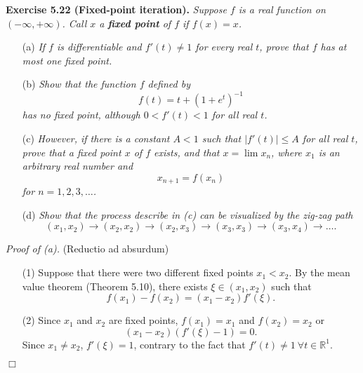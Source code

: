 \documentclass{article}
\begin{document}



\textbf{Exercise 5.22 (Fixed-point iteration).}
\emph{Suppose $f$ is a real function on $(-\infty,+\infty)$.
Call $x$ a \textbf{fixed point} of $f$ if $f(x)=x$.}
\begin{enumerate}
  \item[(a)]
  \emph{If $f$ is differentiable and $f'(t) \neq 1$ for every real $t$,
  prove that $f$ has at most one fixed point.}

  \item[(b)]
  \emph{Show that the function $f$ defined by
  \[
    f(t) = t+(1+e^t)^{-1}
  \]
  has no fixed point, although $0 < f'(t) < 1$ for all real $t$.}

  \item[(c)]
  \emph{However, if there is a constant $A<1$ such that $|f'(t)| \leq A$ for all real $t$,
  prove that a fixed point $x$ of $f$ exists,
  and that $x = \lim x_n$, where $x_1$ is an arbitrary real number and
  \[
    x_{n+1} = f(x_n)
  \]
  for $n = 1,2,3,\ldots$.}

  \item[(d)]
  \emph{Show that the process describe in (c) can be visualized by the zig-zag path
  \[
    (x_1,x_2) \to (x_2,x_2) \to (x_2,x_3) \to (x_3,x_3) \to (x_3,x_4) \to \ldots.
  \]}
  \end{enumerate}

\emph{Proof of (a).}
(Reductio ad absurdum)
\begin{enumerate}
\item[(1)]
Suppose that there were two different fixed points $x_1 < x_2$.
By the mean value theorem (Theorem 5.10),
there exists $\xi \in (x_1, x_2)$ such that
\[
  f(x_1) - f(x_2) = (x_1 - x_2) f'(\xi).
\]

\item[(2)]
Since $x_1$ and $x_2$ are fixed points, $f(x_1) = x_1$ and $f(x_2) = x_2$ or
\[
  (x_1 - x_2)(f'(\xi) - 1) = 0.
\]
Since $x_1 \neq x_2$, $f'(\xi) = 1$,
contrary to the fact that $f'(t) \neq 1 \: \forall t \in \mathbb{R}^1$.
\end{enumerate}
$\Box$ \\
\end{document}

